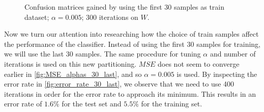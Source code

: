 \documentclass{article}
\begin{document}
\begin{figure}
    \centering
    \qquad
    \caption{Confusion matrices gained by using the first 30 samples as train dataset;%
    $\alpha = 0.005$; 300 iterations on $W$.}\label{fig:CM_30_first}
\end{figure}

Now we turn our attention into researching how the choice of train samples affect the performance of
the classifier. Instead of using the first 30 samples for training, we will use the last 30 samples.
The same procedure for tuning $\alpha$ and number of iterations is used on this new partitioning.
$MSE$ does not seem to converge earlier in \autoref{fig:MSE_alphas_30_last}, and so
$\alpha = 0.005$ is used. By inspecting the error rate in \autoref{fig:error_rate_30_last}, we observe that we
need to use 400 iterations in order for the error rate to approach its minimum. This results in an error rate of
$1.6\%$ for the test set and $5.5\%$ for the training set.
\end{document}
